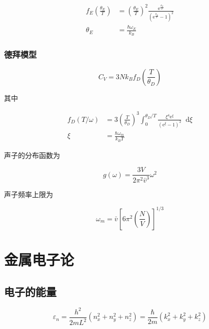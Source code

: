 \documentclass{article}
\newcommand*{\md}{\mathop{}\!\mathrm{d}}
\newcommand*{\me}{\mathrm{e}}
\begin{document}
\begin{multicols}{2}
\begin{equation*}
  \begin{aligned}
    f_E \left( \frac{\theta_E}{T} \right) &= \left( \frac{\theta_E}{T} \right)^2 \frac{\me^{\frac{\theta_E}{T}}}{\left( \me^{\frac{\theta_E}{T}} -1 \right)^2} \\
    \theta_E &= \frac{\hbar \omega_E}{k_B}
  \end{aligned}
\end{equation*}

\subsubsection{德拜模型}

\begin{equation*}
  C_V = 3Nk_B f_D \left( \frac{T}{\theta_D} \right)
\end{equation*}

其中

\begin{equation*}
  \begin{aligned}
    f_D \left( T / \omega \right) &= 3 \left( \frac{T}{\theta_D}  \right)^3 \int_0^{\theta_D / T} \frac{\xi^4 \me^{\xi}}{\left( \me^{\xi} - 1 \right)^2} \md \xi \\
    \xi &= \frac{\hbar \omega_m}{k_B T}
  \end{aligned}
\end{equation*}

声子的分布函数为

\begin{equation*}
  g \left( \omega \right) = \frac{3 V}{2\pi^2 \bar{v}^3} \omega^2
\end{equation*}

声子频率上限为

\begin{equation*}
  \omega_m = \bar{v} \left[ 6\pi^2 \left( \frac{N}{V} \right) \right]^{1/3}
\end{equation*}

\section{金属电子论}

\subsection{电子的能量}

\begin{equation*}
  \varepsilon_n = \frac{h^2}{2mL^2} \left( n_x^2 + n_y^2 + n_z^2 \right) = \frac{\hbar}{2m} \left( k_x^2 + k_y^2 + k_z^2 \right) 
\end{equation*}


\end{multicols}
\end{document}
